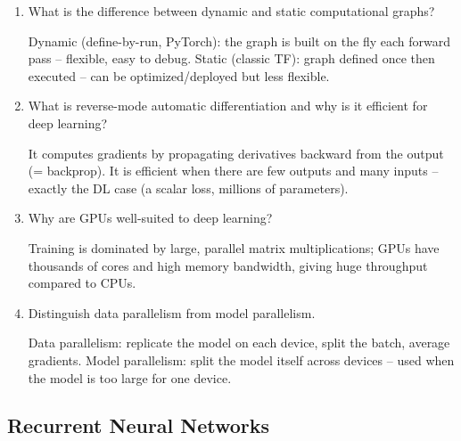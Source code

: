 \documentclass[10pt,a4paper]{article}
\newcommand{\q}[1]{\item #1}
\begin{document}
\begin{enumerate}[leftmargin=*,label=\textbf{Q\arabic*.}]

\q What is the difference between dynamic and static computational graphs?
\begin{answerbox}
Dynamic (define-by-run, PyTorch): the graph is built on the fly each forward pass -- flexible, easy to debug. Static (classic TF): graph defined once then executed -- can be optimized/deployed but less flexible.
\end{answerbox}

\q What is reverse-mode automatic differentiation and why is it efficient for deep learning?
\begin{answerbox}
It computes gradients by propagating derivatives backward from the output (= backprop). It is efficient when there are few outputs and many inputs -- exactly the DL case (a scalar loss, millions of parameters).
\end{answerbox}

\q Why are GPUs well-suited to deep learning?
\begin{answerbox}
Training is dominated by large, parallel matrix multiplications; GPUs have thousands of cores and high memory bandwidth, giving huge throughput compared to CPUs.
\end{answerbox}

\q Distinguish data parallelism from model parallelism.
\begin{answerbox}
Data parallelism: replicate the model on each device, split the batch, average gradients. Model parallelism: split the model itself across devices -- used when the model is too large for one device.
\end{answerbox}

\end{enumerate}

\subsection{Recurrent Neural Networks}
\end{document}
